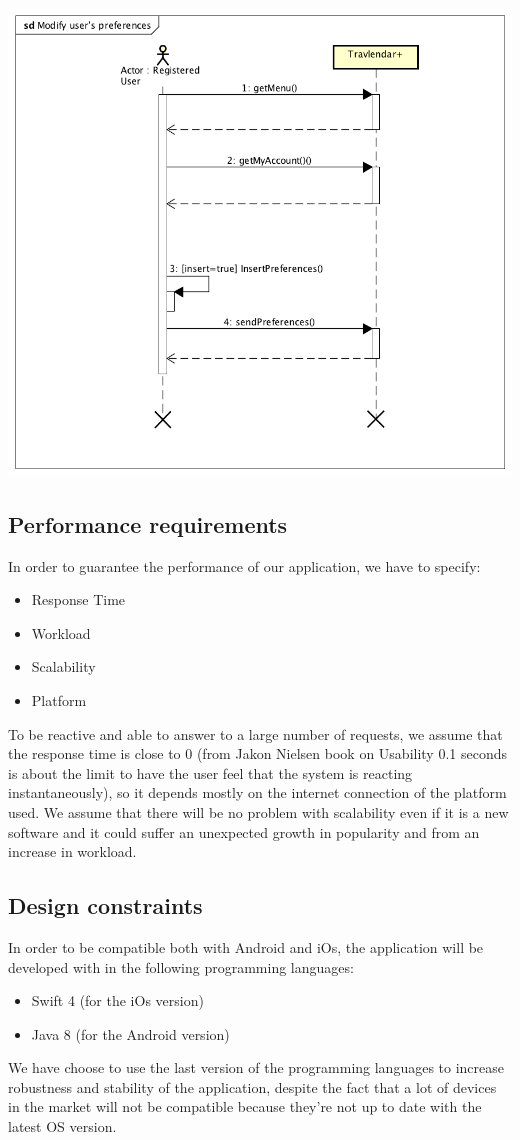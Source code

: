 \documentclass[12pt,titlepage]{article}
\begin{document}
\includegraphics[scale=0.7]{"SequenceDiagram Modify user's preferences"} 
\pagebreak

\subsection{Performance requirements}\label{sec:mod1}
In order to guarantee the performance of our application, we have to specify:
\begin{itemize}
\item Response Time 
\item Workload
\item Scalability
\item Platform
\end{itemize}
To be reactive and able to answer to a large number of requests, we assume that the response time is close to 0 (from Jakon Nielsen book on Usability 0.1 seconds is about the limit to have the user feel that the system is reacting instantaneously), so it depends mostly on the internet connection of the platform used. 
We assume that there will be no problem with scalability even if it is a new software and it could suffer an unexpected growth in popularity and from an increase in workload.

\subsection{Design constraints}\label{sec:mod1}
In order to be compatible both with Android and iOs, the application will be developed with in the following programming languages:
\begin{itemize}
\item Swift 4 (for the iOs version)
\item Java 8 (for the Android version)
\end{itemize}
We have choose to use the last version of the programming languages to increase robustness and stability of the application, despite the fact that a lot of devices in the market will not be compatible because they're not up to date with the latest OS version.
\end{document}
